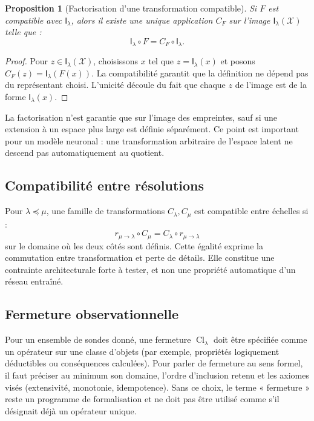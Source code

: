 \documentclass[11pt,a4paper]{article}
\newtheorem{proposition}[definition]{Proposition}
\theoremstyle{remark}
\newcommand{\X}{\mathcal X}
\newcommand{\Emp}{\mathsf I}
\newcommand{\1}{\mathbf 1}
\begin{document}
\begin{proposition}[Factorisation d'une transformation compatible]
Si $F$ est compatible avec $\Emp_\lambda$, alors il existe une unique application $C_F$ sur l'image $\Emp_\lambda(\X)$ telle que :
\[
\boxed{\Emp_\lambda\circ F=C_F\circ\Emp_\lambda.}
\]
\end{proposition}
\begin{proof}
Pour $z\in\Emp_\lambda(\X)$, choisissons $x$ tel que $z=\Emp_\lambda(x)$ et posons $C_F(z)=\Emp_\lambda(F(x))$. La compatibilité garantit que la définition ne dépend pas du représentant choisi. L'unicité découle du fait que chaque $z$ de l'image est de la forme $\Emp_\lambda(x)$.
\end{proof}

La factorisation n'est garantie que sur l'image des empreintes, sauf si une extension à un espace plus large est définie séparément. Ce point est important pour un modèle neuronal : une transformation arbitraire de l'espace latent ne descend pas automatiquement au quotient.

\subsection{Compatibilité entre résolutions}
Pour $\lambda\preceq\mu$, une famille de transformations $C_\lambda,C_\mu$ est compatible entre échelles si :
\[
\boxed{r_{\mu\to\lambda}\circ C_\mu=C_\lambda\circ r_{\mu\to\lambda}}
\]
sur le domaine où les deux côtés sont définis. Cette égalité exprime la commutation entre transformation et perte de détails. Elle constitue une contrainte architecturale forte à tester, et non une propriété automatique d'un réseau entraîné.

\subsection{Fermeture observationnelle}
Pour un ensemble de sondes donné, une fermeture $\operatorname{Cl}_\lambda$ doit être spécifiée comme un opérateur sur une classe d'objets (par exemple, propriétés logiquement déductibles ou conséquences calculées). Pour parler de fermeture au sens formel, il faut préciser au minimum son domaine, l'ordre d'inclusion retenu et les axiomes visés (extensivité, monotonie, idempotence). Sans ce choix, le terme « fermeture » reste un programme de formalisation et ne doit pas être utilisé comme s'il désignait déjà un opérateur unique.

\end{document}
